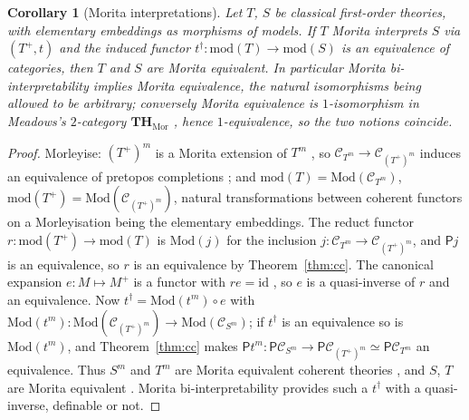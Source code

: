 \documentclass[11pt]{amsart}
\newtheorem{cor}[thm]{Corollary}
\theoremstyle{definition}
\newcommand{\Mod}{\mathrm{Mod}}
\newcommand{\PP}{\mathsf P}
\newcommand{\cC}{\mathcal C}
\begin{document}
\begin{cor}[Morita interpretations]\label{cor:meadows}
Let $T$, $S$ be classical first-order theories, with elementary
embeddings as morphisms of models. If $T$ Morita interprets $S$ via
$(T^+,t)$ and the induced functor $t^\dagger\colon\mathrm{mod}(T)\to
\mathrm{mod}(S)$ is an equivalence of categories, then $T$ and $S$ are
Morita equivalent. In particular Morita bi-interpretability implies
Morita equivalence, the natural isomorphisms being allowed to be
arbitrary; conversely Morita equivalence is $1$-isomorphism in Meadows's
$2$-category $\mathbf{TH}_{\mathrm{Mor}}$ \cite[Cor.~47]{Meadows24},
hence $1$-equivalence, so the two notions coincide.
\end{cor}
\begin{proof}
Morleyise: $(T^+)^m$ is a Morita extension of $T^m$
\cite[proof of Thm.~5.4]{Tsem17}, so $\cC_{T^m}\to\cC_{(T^+)^m}$ induces
an equivalence of pretopos completions \cite[Cor.~4.9]{Tsem17}; and
$\mathrm{mod}(T)=\Mod(\cC_{T^m})$, $\mathrm{mod}(T^+)=\Mod(\cC_{(T^+)^m})$,
natural transformations between coherent functors on a Morleyisation
being the elementary embeddings. The reduct functor $r\colon
\mathrm{mod}(T^+)\to\mathrm{mod}(T)$ is $\Mod(j)$ for the inclusion
$j\colon\cC_{T^m}\to\cC_{(T^+)^m}$, and $\PP j$ is an equivalence, so
$r$ is an equivalence by Theorem~\ref{thm:cc}. The canonical
expansion $e\colon M\mapsto M^+$ is a functor with $re=\mathrm{id}$
\cite[Thm.~42]{Meadows24}, so $e$ is a quasi-inverse of $r$ and an
equivalence. Now $t^\dagger=\Mod(t^m)\circ e$ with $\Mod(t^m)\colon
\Mod(\cC_{(T^+)^m})\to\Mod(\cC_{S^m})$; if $t^\dagger$ is an equivalence
so is $\Mod(t^m)$, and Theorem~\ref{thm:cc} makes $\PP t^m\colon\PP
\cC_{S^m}\to\PP\cC_{(T^+)^m}\simeq\PP\cC_{T^m}$ an equivalence. Thus
$S^m$ and $T^m$ are Morita equivalent coherent theories
\cite[Thm.~4.7]{Tsem17}, and $S$, $T$ are Morita equivalent
\cite[Thm.~5.4]{Tsem17}. Morita bi-interpretability provides such a
$t^\dagger$ with a quasi-inverse, definable or not.
\end{proof}
\end{document}

